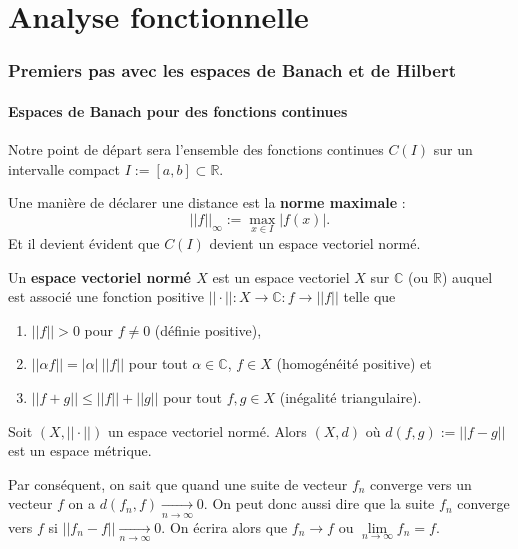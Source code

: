 \part{Analyse fonctionnelle}

\section{Premiers pas avec les espaces de Banach et de Hilbert}

\subsection{Espaces de Banach pour des fonctions continues}

Notre point de départ sera l'ensemble des fonctions continues $C(I)$ sur un intervalle compact $I := \left[ a,b \right] \subset \mathbb{R}$.

Une manière de déclarer une distance est la \textbf{norme maximale} :
\begin{equation*}
    ||f||_\infty := \max_{x\in I}|f(x)|.
\end{equation*}
Et il devient évident que $C(I)$ devient un espace vectoriel normé.

\begin{definition}
    Un \textbf{espace vectoriel normé $X$} est un espace vectoriel $X$ sur $\mathbb{C}$ (ou $\mathbb{R}$) auquel est associé une fonction positive $||\cdot||:X \rightarrow \mathbb{C}:f \rightarrow ||f||$ telle que
    \begin{enumerate}[label=(\roman*)]
        \item $||f||>0$ pour $f\neq0$ (définie positive),
        \item $||\alpha f|| = |\alpha|\ ||f||$ pour tout $\alpha\in\mathbb{C}$, $f\in X$ (homogénéité positive) et
        \item $||f+g||\leq||f||+||g||$ pour tout $f,g\in X$ (inégalité triangulaire).
    \end{enumerate}
\end{definition}

\begin{remark}
    Soit $(X,||\cdot||)$ un espace vectoriel normé. Alors $(X,d)$ où $d(f,g):=||f-g||$ est un espace métrique.
\end{remark}

Par conséquent, on sait que quand une suite de vecteur $f_n$ converge vers un vecteur $f$ on a $d(f_n,f)\underset{n\to\infty}{\longrightarrow} 0$. On peut donc aussi dire que la suite $f_n$ converge vers $f$ si $||f_n-f|| \underset{n\to\infty}{\longrightarrow} 0$. On écrira alors que $f_n\rightarrow f$ ou $\lim \limits_{n\to\infty} f_n = f$.

